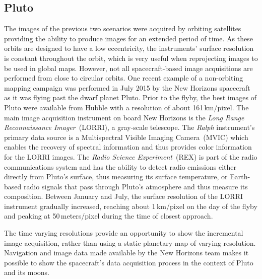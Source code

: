 \documentclass[journal]{vgtc}                %
\begin{document}
\subsection{Pluto} \label{sec:scenario:pluto}
The images of the previous two scenarios were acquired by orbiting satellites providing the ability to produce images for an extended period of time.
As these orbits are designed to have a low eccentricity, the instruments' surface resolution is constant throughout the orbit, which is very useful when reprojecting images to be used in global maps.
However, not all spacecraft-based image acquisitions are performed from close to circular orbits.
One recent example of a non-orbiting mapping campaign was performed in July 2015 by the New Horizons spacecraft as it was flying past the dwarf planet Pluto.
Prior to the flyby, the best images of Pluto were available from Hubble with a resolution of about 161\,km/pixel.
The main image acquisition instrument on board New Horizons is the \emph{Long Range Reconnaissance Imager}~(LORRI), a gray-scale telescope.
The \emph{Ralph} instrument's primary data source is a Multispectral Visible Imaging Camera~(MVIC) which enables the recovery of spectral information and thus provides color information for the LORRI images.
The \emph{Radio Science Experiment}~(REX) is part of the radio communications system and has the ability to detect radio emissions either directly from Pluto's surface, thus measuring its surface temperature, or Earth-based radio signals that pass through Pluto's atmosphere and thus measure its composition.
Between January and July, the surface resolution of the LORRI instrument gradually increased, reaching about 1\,km/pixel on the day of the flyby and peaking at 50\,meters/pixel during the time of closest approach.

The time varying resolutions provide an opportunity to show the incremental image acquisition, rather than using a static planetary map of varying resolution. Navigation and image data made available by the New Horizons team makes it possible to show the spacecraft's data acquisition process in the context of Pluto and its moons.

\end{document}

